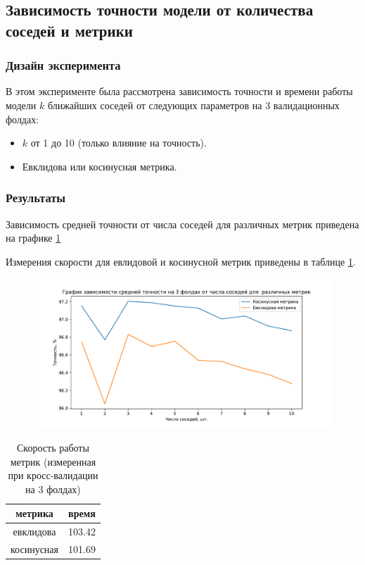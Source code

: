 \documentclass[a4paper, 11pt]{article}
\begin{document}
    \subsection{Зависимость точности модели от количества соседей и метрики}
    \subsubsection{Дизайн эксперимента}
    В этом эксперименте была рассмотрена зависимость точности и времени работы модели $k$ ближайших соседей от следующих параметров на 3 валидационных фолдах:
    \begin{itemize}
        \item $k$ от 1 до 10 (только влияние на точность).
        \item Евклидова или косинусная метрика.
    \end{itemize}
    
    
    \subsubsection{Результаты}
        Зависимость средней точности от числа соседей для различных метрик приведена на графике \ref{exp2:graph}
        
        Измерения скорости для евлидовой и косинусной метрик приведены в таблице \ref{exp2:speed}.
    \begin{figure}[h]
        \caption{}\label{exp2:graph}
        \includegraphics[width=\textwidth]{../experiment2_graph.pdf}
    \end{figure} 
    
    \begin{table}[h]
        \begin{center} 
            \caption{Скорость работы метрик (измеренная при кросс-валидации на 3 фолдах)} \label{exp2:speed}
            \begin{tabular}{|c|c|}
                \hline 
                метрика & время \\ 
                \hline 
                евклидова & 103.42 \\ 
                \hline 
                косинусная & 101.69 \\ 
                \hline 
            \end{tabular}
        \end{center}
    \end{table}
    
\end{document}
